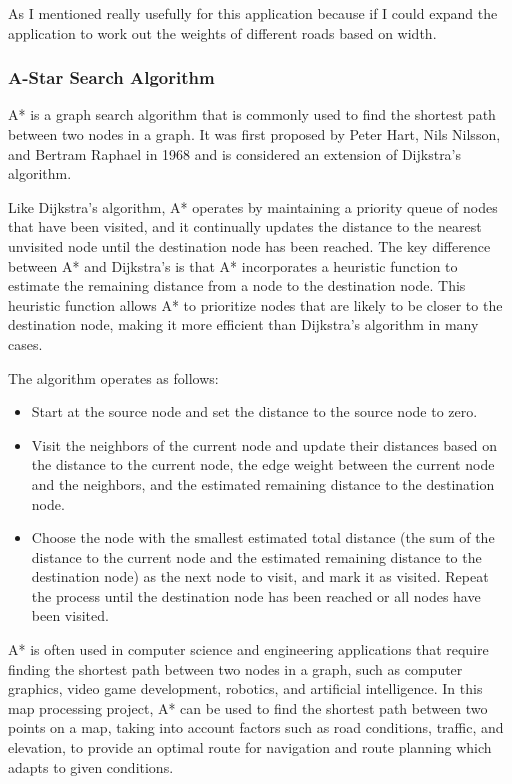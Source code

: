 \begin{FlushLeft}
    As I mentioned really usefully for this application because if I could expand the application to work out the weights of different roads based on width. \\ 
    \bk
    
    \subsubsection{A-Star Search Algorithm}
    A* is a graph search algorithm that is commonly used to find the shortest path between two nodes in a graph. It was first proposed by Peter Hart, Nils Nilsson, and Bertram Raphael in 1968 and is considered an extension of Dijkstra's algorithm. \\ \bk

    Like Dijkstra's algorithm, A* operates by maintaining a priority queue of nodes that have been visited, and it continually updates the distance to the nearest unvisited node until the destination node has been reached. The key difference between A* and Dijkstra's is that A* incorporates a heuristic function to estimate the remaining distance from a node to the destination node. This heuristic function allows A* to prioritize nodes that are likely to be closer to the destination node, making it more efficient than Dijkstra's algorithm in many cases. \\ \bk

    The algorithm operates as follows:
    \begin{itemize}
        \item Start at the source node and set the distance to the source node to zero.
        \item Visit the neighbors of the current node and update their distances based on the distance to the current node, the edge weight between the current node and the neighbors, and the estimated remaining distance to the destination node.
        \item Choose the node with the smallest estimated total distance (the sum of the distance to the current node and the estimated remaining distance to the destination node) as the next node to visit, and mark it as visited. Repeat the process until the destination node has been reached or all nodes have been visited.
    \end{itemize}

    A* is often used in computer science and engineering applications that require finding the shortest path between two nodes in a graph, such as computer graphics, video game development, robotics, and artificial intelligence. In this map processing project, A* can be used to find the shortest path between two points on a map, taking into account factors such as road conditions, traffic, and elevation, to provide an optimal route for navigation and route planning which adapts to given conditions. \\ \bk


\end{FlushLeft}
